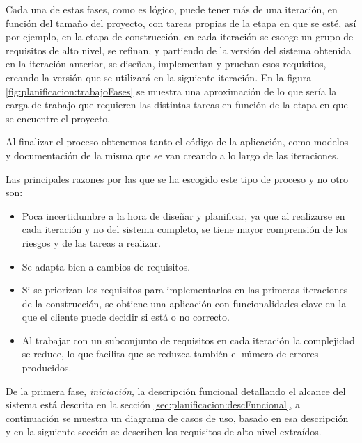 Cada una de estas fases, como es lógico, puede tener más de una iteración, en función del tamaño del proyecto, con tareas propias de la etapa en que se esté, así por ejemplo, en la etapa de construcción, en cada iteración se escoge un grupo de requisitos de alto nivel, se refinan, y partiendo de la versión del sistema obtenida en la iteración anterior, se diseñan, implementan y prueban esos requisitos, creando la versión que se utilizará en la siguiente iteración. En la figura \ref{fig:planificacion:trabajoFases} se muestra una aproximación de lo que sería la carga de trabajo que requieren las distintas tareas en función de la etapa en que se encuentre el proyecto.
\newline

Al finalizar el proceso obtenemos tanto el código de la aplicación, como modelos y documentación de la misma que se van creando a lo largo de las iteraciones.
\newline


Las principales razones por las que se ha escogido este tipo de proceso y no otro son:

\begin{itemize}

	\item[\ding{70}] Poca incertidumbre a la hora de diseñar y planificar, ya que al realizarse en cada iteración y no del sistema completo, se tiene mayor comprensión de los riesgos y de las tareas a realizar.

	\item[\ding{70}] Se adapta bien a cambios de requisitos.

	\item[\ding{70}] Si se priorizan los requisitos para implementarlos en las primeras iteraciones de la construcción, se obtiene una aplicación con funcionalidades clave en la que el cliente puede decidir si está o no correcto.

	\item[\ding{70}] Al trabajar con un subconjunto de requisitos en cada iteración la complejidad se reduce, lo que facilita que se reduzca también el número de errores producidos.

\end{itemize}



De la primera fase, \emph{iniciación}, la descripción funcional detallando el alcance del sistema está descrita en la sección \ref{sec:planificacion:descFuncional}, a continuación se muestra un diagrama de casos de uso, basado en esa descripción y en la siguiente sección se describen los requisitos de alto nivel extraídos.

